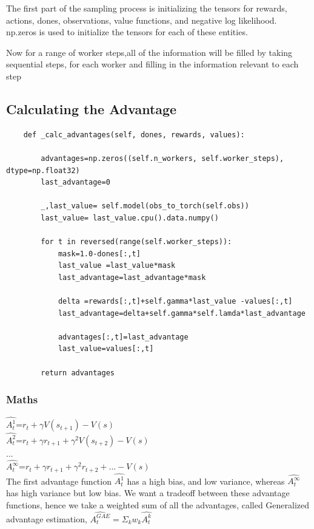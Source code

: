 \documentclass[12pt]{extarticle}
\begin{document}
The first part of the sampling process is initializing the tensors for rewards, actions, dones, observations, value functions, and negative log likelihood. \\
np.zeros is used to initialize the tensors for each of these entities.

Now for a range of worker steps,all of the information will be filled by taking sequential steps, for each worker and filling in the information relevant to each step

\subsection{Calculating the Advantage}

\begin{lstlisting}
	def _calc_advantages(self, dones, rewards, values):

		advantages=np.zeros((self.n_workers, self.worker_steps), dtype=np.float32)
		last_advantage=0

		_,last_value= self.model(obs_to_torch(self.obs))
		last_value= last_value.cpu().data.numpy()

		for t in reversed(range(self.worker_steps)):
			mask=1.0-dones[:,t]
			last_value =last_value*mask
			last_advantage=last_advantage*mask

			delta =rewards[:,t]+self.gamma*last_value -values[:,t]
			last_advantage=delta+self.gamma*self.lamda*last_advantage

			advantages[:,t]=last_advantage
			last_value=values[:,t]

		return advantages
\end{lstlisting}

\subsubsection{Maths}
$\hat{A_t^{1}}$=$r_t+\gamma V(s_{t+1})-V(s)$\\
$\hat{A_t^{2}}$=$r_t+\gamma r_{t+1}+\gamma^2 V(s_{t+2})-V(s)$\\
...\\
$\hat{A_t^{\infty}}$=$r_t+\gamma r_{t+1}+\gamma^2 r_{t+2}+...-V(s)$\\

The first advantage function $\hat{A_t^{1}}$ has a high bias, and low variance, whereas $\hat{A_t^{\infty}}$ has high variance but low bias. We want a tradeoff between these advantage functions, hence we take a weighted sum of all the advantages, called Generalized advantage estimation, $\hat{A_t^{GAE}}=\Sigma_k w_k \hat{A_t^{k}} $\\
\end{document}
